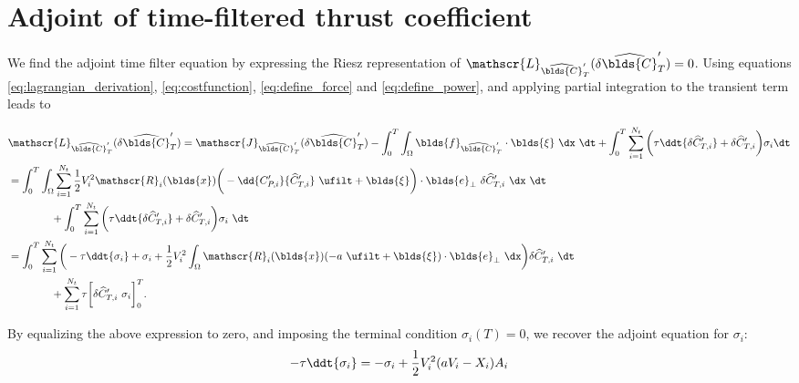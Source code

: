 \section{Adjoint of time-filtered thrust coefficient}
We find the adjoint time filter equation by expressing the Riesz representation of $\mathscr{L}_{\widehat{\blds{C}}_T'} (\delta \widehat{\blds{C}}_T') = 0$. Using equations \eqref{eq:lagrangian_derivation}, \eqref{eq:costfunction}, \eqref{eq:define_force} and \eqref{eq:define_power}, and applying partial integration to the transient term leads to

{\footnotesize
\begin{align}
&\mathscr{L}_{\widehat{\blds{C}}_T'}(\delta {\widehat{\blds{C}}_T'}) = \mathscr{J}_{\widehat{\blds{C}}_T'}(\delta \widehat{\blds{C}}_T') - \int_0^T \int_\Omega \blds{f}_{\widehat{\blds{C}}_T'} \cdot \blds{\xi}~\dx~\dt + \int_0^T \sum_{i=1}^{N_t} \bigg( \tau \ddt{\delta \widehat{C}_{T,i}'} + \delta \widehat{C}_{T,i}' \bigg) \sigma_i \dt\\
&= \int_0^T \int_\Omega \sum_{i=1}^{N_t} \frac{1}{2} V_{i}^2 \mathscr{R}_i(\blds{x}) \bigg( -\dd{C_{P,i}'}{\widehat{C}_{T,i}'}~\ufilt + \blds{\xi} \bigg)  \cdot \blds{e}_\perp \  \delta \widehat{C}_{T,i}'~\dx~\dt \nonumber\\
& \qquad \qquad + \int_0^T \sum_{i=1}^{N_t} \bigg( \tau \ddt{\delta \widehat{C}_{T,i}'} + \delta \widehat{C}_{T,i}' \bigg) \sigma_i~\dt \\ 
&= \int_0^T \sum_{i=1}^{N_t} \bigg( -\tau \ddt{\sigma_i} + \sigma_i + \frac{1}{2} V_{i}^2 \int_\Omega \mathscr{R}_i(\blds{x}) (-a~\ufilt + \blds{\xi}) \cdot \blds{e}_\perp~\dx \bigg) \delta \widehat{C}_{T,i}'~\dt \nonumber\\
& \qquad \qquad + \sum_{i=1}^{N_t} \tau \bigg[\delta \widehat{C}_{T,i}'\ \sigma_i \bigg]_0^T.    
\end{align}
}

By equalizing the above expression to zero, and imposing the terminal condition $\sigma_i(T)=0$, we recover the adjoint equation for $\sigma_i$: 
\begin{equation}
	-\tau \ddt{\sigma_i} = -\sigma_i + \frac{1}{2} V_i^2  (a V_i - X_i) A_i
\end{equation}


